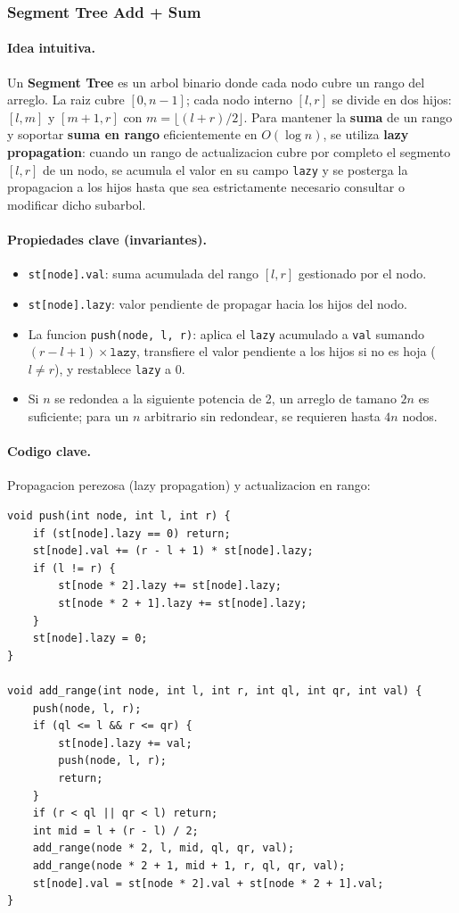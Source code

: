 \subsubsection{Segment Tree Add + Sum}

\paragraph{Idea intuitiva.}
Un \textbf{Segment Tree} es un arbol binario donde cada nodo cubre un rango del arreglo. La raiz cubre $[0, n-1]$; cada nodo interno $[l, r]$ se divide en dos hijos: $[l, m]$ y $[m+1, r]$ con $m = \lfloor (l + r) / 2 \rfloor$. Para mantener la \textbf{suma} de un rango y soportar \textbf{suma en rango} eficientemente en $O(\log n)$, se utiliza \textbf{lazy propagation}: cuando un rango de actualizacion cubre por completo el segmento $[l, r]$ de un nodo, se acumula el valor en su campo \texttt{lazy} y se posterga la propagacion a los hijos hasta que sea estrictamente necesario consultar o modificar dicho subarbol.

\paragraph{Propiedades clave (invariantes).}
\begin{itemize}\setlength\itemsep{0pt}
	\item \texttt{st[node].val}: suma acumulada del rango $[l, r]$ gestionado por el nodo.
	\item \texttt{st[node].lazy}: valor pendiente de propagar hacia los hijos del nodo.
	\item La funcion \texttt{push(node, l, r)}: aplica el \texttt{lazy} acumulado a \texttt{val} sumando $(r - l + 1) \times \texttt{lazy}$, transfiere el valor pendiente a los hijos si no es hoja ($l \ne r$), y restablece \texttt{lazy} a $0$.
	\item Si $n$ se redondea a la siguiente potencia de 2, un arreglo de tamano $2n$ es suficiente; para un $n$ arbitrario sin redondear, se requieren hasta $4n$ nodos.
\end{itemize}

\paragraph{Codigo clave.}
Propagacion perezosa (lazy propagation) y actualizacion en rango:
\begin{verbatim}
void push(int node, int l, int r) {
    if (st[node].lazy == 0) return;
    st[node].val += (r - l + 1) * st[node].lazy;
    if (l != r) {
        st[node * 2].lazy += st[node].lazy;
        st[node * 2 + 1].lazy += st[node].lazy;
    }
    st[node].lazy = 0;
}

void add_range(int node, int l, int r, int ql, int qr, int val) {
    push(node, l, r);
    if (ql <= l && r <= qr) {
        st[node].lazy += val;
        push(node, l, r);
        return;
    }
    if (r < ql || qr < l) return;
    int mid = l + (r - l) / 2;
    add_range(node * 2, l, mid, ql, qr, val);
    add_range(node * 2 + 1, mid + 1, r, ql, qr, val);
    st[node].val = st[node * 2].val + st[node * 2 + 1].val;
}
\end{verbatim}

